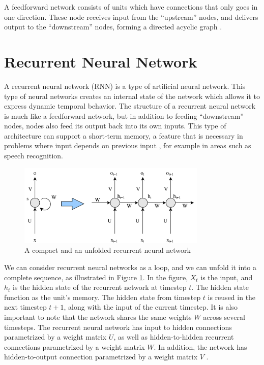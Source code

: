 A feedforward network consists of units which have connections that only goes in one direction. These node receives input from the ``upstream'' nodes, and delivers output to the ``downstream'' nodes, forming a directed acyclic graph \citep{russell2010aimodernapproach}.


\section{Recurrent Neural Network}
\label{sec:reccurent_neural_network}
A recurrent neural network (RNN) is a type of artificial neural network. This type of neural networks creates an internal state of the network which allows it to express dynamic temporal behavior. The structure of a recurrent neural network is much like a feedforward network, but in addition to feeding ``downstream'' nodes, nodes also feed its output back into its own inputs. This type of architecture can support a short-term memory, a feature that is necessary in problems where input depends on previous input \citep{russell2010aimodernapproach}, for example in areas such as speech recognition.

\begin{figure}[h]
    \centering
    \includegraphics[width=0.8\textwidth]{fig/related_work/nn_recurrent.png}
    \caption{A compact and an unfolded recurrent neural network}
    \label{fig:nn-rnn}
\end{figure}

We can consider recurrent neural networks as a loop, and we can unfold it into a complete sequence, as illustrated in Figure \ref{fig:nn-rnn}. In the figure, \(X_{t}\) is the input, and \(h_{t}\) is the hidden state of the recurrent network at timestep \(t\). The hidden state function as the unit's memory. The hidden state from timestep \(t\) is reused in the next timestep \(t+1\), along with the input of the current timestep. It is also important to note that the network shares the same weights \(W\) across several timesteps. The recurrent neural network has input to hidden connections parametrized by a weight matrix \(U\), as well as hidden-to-hidden recurrent connections parametrized by a weight matrix \(W\). In addition, the network has hidden-to-output connection parametrized by a weight matrix \(V\) \citep{goodfellow2016deeplearning}.

